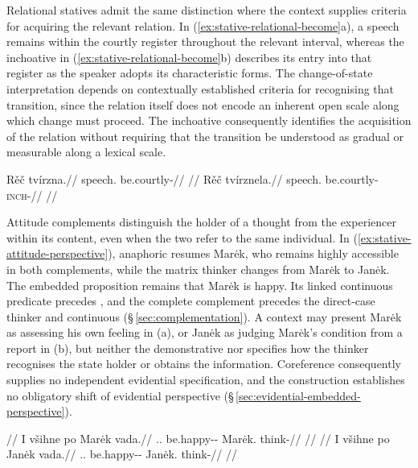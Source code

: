 Relational statives admit the same distinction where the context supplies
criteria for acquiring the relevant relation. In
(\ref{ex:stative-relational-become}a), a speech remains within the courtly
register throughout the relevant interval, whereas the inchoative in
(\ref{ex:stative-relational-become}b) describes its entry into that register
as the speaker adopts its characteristic forms. The change-of-state
interpretation depends on contextually established criteria for recognising
that transition, since the relation itself does not encode an inherent open
scale along which change must proceed. The inchoative consequently
identifies the acquisition of the relation without requiring that the
transition be understood as gradual or measurable along a lexical scale.

\pex\label{ex:stative-relational-become}
\a
\begingl
\gla Rěč tvírzna.//
\glb speech.\Dir{} be.courtly-\Cont{}//
\glft {}
//
\endgl
\a
\begingl
\gla Rěč tvírznela.//
\glb speech.\Dir{} be.courtly-\textsc{inch}-\Cont{}//
\glft {}
//
\endgl
\xe

Attitude complements distinguish the holder of a thought from the experiencer
within its content, even when the two refer to the same individual. In
(\ref{ex:stative-attitude-perspective}), anaphoric  resumes Marėk,
who remains highly accessible in both complements, while the matrix thinker
changes from Marėk to Janėk. The embedded proposition remains that Marėk is
happy. Its linked continuous predicate  precedes ,
and the complete complement precedes the direct-case thinker and continuous
  (§\,\ref{sec:complementation}). A context may
present Marėk as assessing his own feeling in (a), or Janėk as judging Marėk's
condition from a report in (b), but neither the demonstrative nor
 specifies how the thinker recognises the state holder or
obtains the information. Coreference consequently supplies no independent
evidential specification, and the construction establishes no obligatory
shift of evidential perspective
(§\,\ref{sec:evidential-embedded-perspective}).

\pex\label{ex:stative-attitude-perspective}
\a
\begingl
\glpreamble {}//
\gla I všihne po Marėk vada.//
.\Dist{}.\Dir{} be.happy-\Cont{}-\Lnk{} \Compl{} Marėk.\Dir{} think-\Cont{}//
\glft {}//
\endgl
\a
\begingl
\glpreamble {}//
\gla I všihne po Janėk vada.//
.\Dist{}.\Dir{} be.happy-\Cont{}-\Lnk{} \Compl{} Janėk.\Dir{} think-\Cont{}//
\glft {}//
\endgl
\xe

